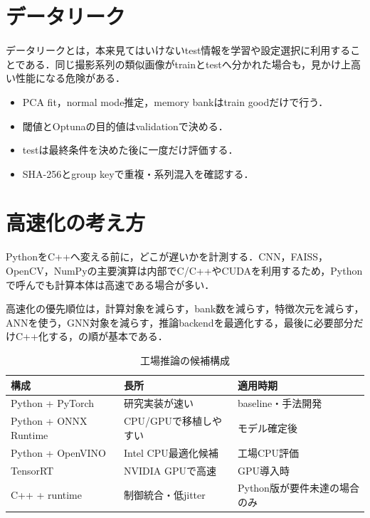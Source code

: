\documentclass[a4paper,11pt]{ltjsarticle}
\begin{document}
\section{データリーク}
データリークとは，本来見てはいけないtest情報を学習や設定選択に利用することである．同じ撮影系列の類似画像がtrainとtestへ分かれた場合も，見かけ上高い性能になる危険がある．
\begin{itemize}
  \item PCA fit，normal mode推定，memory bankはtrain goodだけで行う．
  \item 閾値とOptunaの目的値はvalidationで決める．
  \item testは最終条件を決めた後に一度だけ評価する．
  \item SHA-256とgroup keyで重複・系列混入を確認する．
\end{itemize}

\section{高速化の考え方}
PythonをC++へ変える前に，どこが遅いかを計測する．CNN，FAISS，OpenCV，NumPyの主要演算は内部でC/C++やCUDAを利用するため，Pythonで呼んでも計算本体は高速である場合が多い．

高速化の優先順位は，計算対象を減らす，bank数を減らす，特徴次元を減らす，ANNを使う，GNN対象を減らす，推論backendを最適化する，最後に必要部分だけC++化する，の順が基本である．

\begin{table}[H]
\centering
\caption{工場推論の候補構成}
\begin{tabularx}{\linewidth}{L{37mm}Y Y}
\toprule
構成 & 長所 & 適用時期 \\
\midrule
Python + PyTorch & 研究実装が速い & baseline・手法開発 \\
Python + ONNX Runtime & CPU/GPUで移植しやすい & モデル確定後 \\
Python + OpenVINO & Intel CPU最適化候補 & 工場CPU評価 \\
TensorRT & NVIDIA GPUで高速 & GPU導入時 \\
C++ + runtime & 制御統合・低jitter & Python版が要件未達の場合のみ \\
\bottomrule
\end{tabularx}
\end{table}
\end{document}

